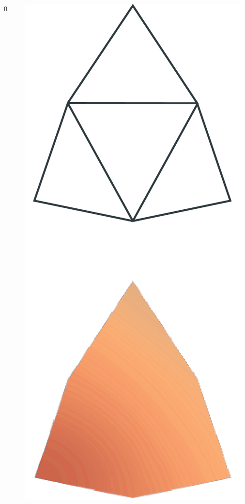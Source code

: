 \begin{frame}
\begin{columns}
\begin{column}[b]{0.22\textwidth}
\begin{center}
					\small{0}
				\end{center}	
			\end{column}
			\begin{column}[b]{0.22\textwidth}
				\begin{center}
					\includegraphics[width=\textwidth]{./img/1_single/lod_lod1.png}	

\end{center}
\end{column}
\end{columns}
\end{frame}
